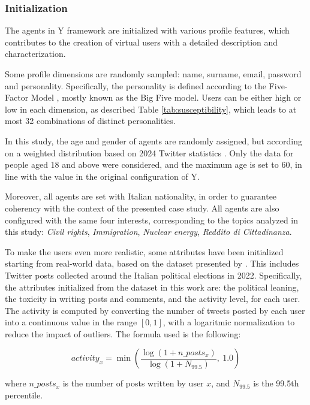 \subsubsection{Initialization}
The agents in Y framework are initialized with various profile features, which contributes to the creation of virtual users with a detailed description and characterization.

Some profile dimensions are randomly sampled: name, surname, email, password and personality.
Specifically, the personality is defined according to the Five-Factor Model \cite{barrick1991bigfive, McCrae1992}, mostly known as the Big Five model. 
Users can be either high or low in each dimension, as described Table \ref{tab:susceptibility}, which leads to at most 32 combinations of distinct personalities.

\medskip
In this study, the age and gender of agents are randomly assigned, but according on a weighted distribution based on 2024 Twitter statistics \cite{statista2024twitter}. 
Only the data for people aged 18 and above were considered, and the maximum age is set to 60, in line with the value in the original configuration of Y.

Moreover, all agents are set with Italian nationality, in order to guarantee coherency with the context of the presented case study.
All agents are also configured with the same four interests, corresponding to the topics analyzed in this study: \textit{Civil rights}, \textit{Immigration}, \textit{Nuclear energy}, \textit{Reddito di Cittadinanza}.

\medskip
To make the users even more realistic, some attributes have been initialized starting from real-world data, based on the dataset presented by \citet{pierri2023ita}. 
This includes Twitter posts collected around the Italian political elections in 2022.
Specifically, the attributes initialized from the dataset in this work are: the political leaning, the toxicity in writing posts and comments, and the activity level, for each user.
The activity is computed by converting the number of tweets posted by each user into a continuous value in the range $[0,1]$, with a logaritmic normalization to reduce the impact of outliers.
The formula used is the following:

\[
activity_x = \min\left( \frac{\log(1 + n\_posts_x)}{\log(1 + N_{99.5})},\ 1.0 \right)
\]

where $n\_posts_x$ is the number of posts written by user $x$, and $N_{99.5}$ is the 99.5th percentile.


